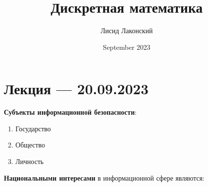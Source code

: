 \documentclass{article}
\title{Дискретная математика}
\author{Лисид Лаконский}
\date{September 2023}
\begin{document}
\raggedright

\maketitle

\tableofcontents
\pagebreak

\section{Лекция — 20.09.2023}

\textbf{Субъекты информационной безопасности}:

\begin{enumerate}
    \item Государство
    \item Общество
    \item Личность
\end{enumerate}

\textbf{Национальными интересами} в информационной сфере являются:
\end{document}
